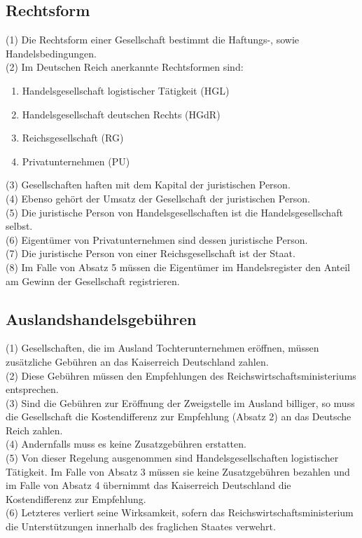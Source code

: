 \documentclass{article}
\begin{document}
\subsection{Rechtsform} \label{gesellform}
(1) Die Rechtsform einer Gesellschaft bestimmt die Haftungs-, sowie Handelsbedingungen.\\
(2) Im Deutschen Reich anerkannte Rechtsformen sind:
\begin{enumerate}
	\item Handelsgesellschaft logistischer Tätigkeit (HGL)
	\item Handelsgesellschaft deutschen Rechts (HGdR)
	\item Reichsgesellschaft (RG)
	\item Privatunternehmen (PU)
\end{enumerate}
(3) Gesellschaften haften mit dem Kapital der juristischen Person.\\
(4) Ebenso gehört der Umsatz der Gesellschaft der juristischen Person.\\
(5) Die juristische Person von Handelsgesellschaften ist die Handelsgesellschaft selbst.\\
(6) Eigentümer von Privatunternehmen sind dessen juristische Person.\\
(7) Die juristische Person von einer Reichsgesellschaft ist der Staat.\\
(8) Im Falle von Absatz 5 müssen die Eigentümer im Handelsregister den Anteil am Gewinn der Gesellschaft registrieren.\\

\subsection{Auslandshandelsgebühren}
(1) Gesellschaften, die im Ausland Tochterunternehmen eröffnen, müssen zusätzliche Gebühren an das Kaiserreich Deutschland zahlen.\\
(2) Diese Gebühren müssen den Empfehlungen des Reichswirtschaftsministeriums entsprechen.\\ 
(3) Sind die Gebühren zur Eröffnung der Zweigstelle im Ausland billiger, so muss die Gesellschaft die Kostendifferenz zur Empfehlung (Absatz 2) an das Deutsche Reich zahlen.\\
(4) Andernfalls muss es keine Zusatzgebühren erstatten.\\
(5) Von dieser Regelung ausgenommen sind Handelsgesellschaften logistischer Tätigkeit. Im Falle von Absatz 3 müssen sie keine Zusatzgebühren bezahlen und im Falle von Absatz 4 übernimmt das Kaiserreich Deutschland die Kostendifferenz zur Empfehlung.\\
(6) Letzteres verliert seine Wirksamkeit, sofern das Reichswirtschaftsministerium die Unterstützungen innerhalb des fraglichen Staates verwehrt.
\end{document}
